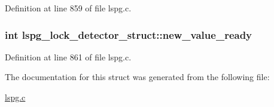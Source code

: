 Definition at line 859 of file lspg.c.\hypertarget{structlspg__lock__detector__struct_a62373414b815fe178edd8522b3bd4d78}{
\subsubsection[{new\_\-value\_\-ready}]{\setlength{\rightskip}{0pt plus 5cm}int {\bf lspg\_\-lock\_\-detector\_\-struct::new\_\-value\_\-ready}}}
\label{structlspg__lock__detector__struct_a62373414b815fe178edd8522b3bd4d78}


Definition at line 861 of file lspg.c.

The documentation for this struct was generated from the following file:\begin{DoxyCompactItemize}
\item 
\hyperlink{lspg_8c}{lspg.c}\end{DoxyCompactItemize}
